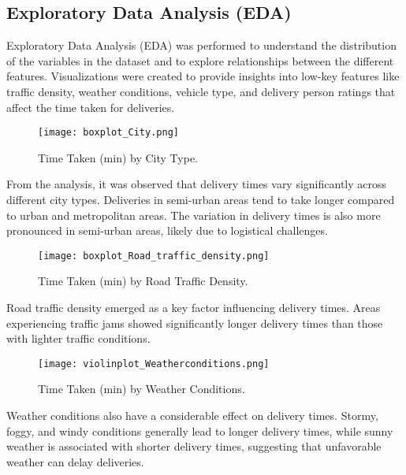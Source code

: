 \documentclass[10pt,twocolumn,letterpaper]{article}
\begin{document}
        \subsection{Exploratory Data Analysis (EDA)}
        Exploratory Data Analysis (EDA) was performed to understand the distribution of the variables in the dataset and to explore relationships between the different features. Visualizations were created to provide insights into low-key features like traffic density, weather conditions, vehicle type, and delivery person ratings that affect the time taken for deliveries.

        \begin{figure}[ht]
            \centering
            \texttt{[image: boxplot\_City.png]}
            \caption{Time Taken (min) by City Type.}
            \label{fig:city_type}
        \end{figure}

        From the analysis, it was observed that delivery times vary significantly across different city types. Deliveries in semi-urban areas tend to take longer compared to urban and metropolitan areas. The variation in delivery times is also more pronounced in semi-urban areas, likely due to logistical challenges.

        \begin{figure}[ht]
            \centering
            \texttt{[image: boxplot\_Road\_traffic\_density.png]}
            \caption{Time Taken (min) by Road Traffic Density.}
            \label{fig:traffic_density}
        \end{figure}

        Road traffic density emerged as a key factor influencing delivery times. Areas experiencing traffic jams showed significantly longer delivery times than those with lighter traffic conditions.

        \begin{figure}[ht]
            \centering
            \texttt{[image: violinplot\_Weatherconditions.png]}
            \caption{Time Taken (min) by Weather Conditions.}
            \label{fig:weather_conditions}
        \end{figure}

        Weather conditions also have a considerable effect on delivery times. Stormy, foggy, and windy conditions generally lead to longer delivery times, while sunny weather is associated with shorter delivery times, suggesting that unfavorable weather can delay deliveries.
\end{document}
